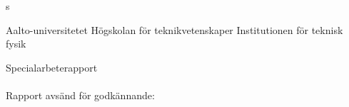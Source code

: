 \begin{titlepage}
{\fi

\if\mylang s

\noindent
\fontsize{12}{14}\selectfont
Aalto-universitetet \newline
Högskolan för teknikvetenskaper \newline
Institutionen för teknisk fysik

\vspace{40mm}

\noindent
\fontsize{14}{16}\selectfont
\myauthor

\vspace{10mm}

\noindent
\fontsize{18}{22}\selectfont
\textbf{\mytitle}

\vspace{90mm}

\noindent
\fontsize{12}{14}\selectfont
Specialarbeterapport \\[4mm]
\mycourse \\[4mm]
Rapport avsänd för godkännande: \mypubdate \\[4mm]
\mbox{}\\[4mm]
 \mysupervisor \\[4mm]
 \myinstructor

\fi

} %

\end{titlepage}



\newpage
